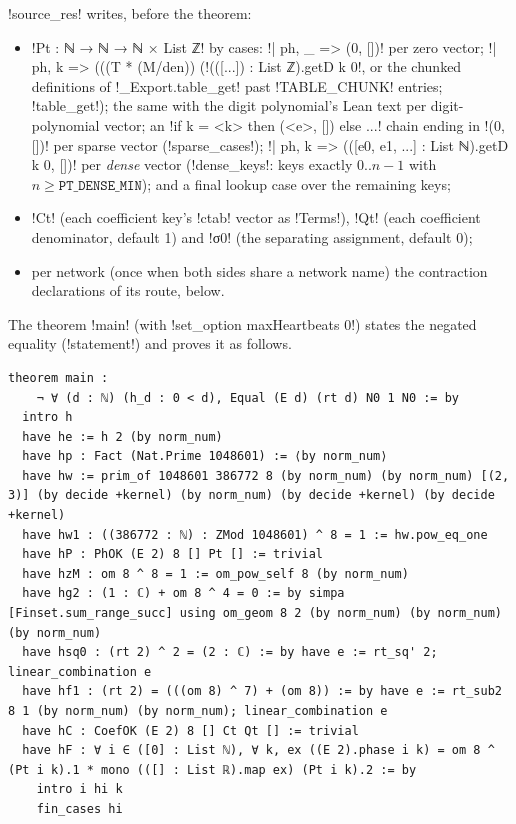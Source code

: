 {{{\lexpy!source_res! writes, before the theorem:
\begin{itemize}
\item \lexlean!Pt : ℕ → ℕ → ℕ × List ℤ! by cases: \lexlean!| ph, _ => (0, [])! per zero vector;
\lexlean!| ph, k => (((T * (M/den)) %
(\lexlean!(([...]) : List ℤ).getD k 0!, or the chunked definitions of \lexpy!_Export.table_get! past
\lexpy!TABLE_CHUNK! entries; \lexpy!table_get!); the same with the digit polynomial's Lean text per
digit-polynomial vector; an \lexcode!if k = <k> then (<e>, []) else ...! chain ending in
\lexlean!(0, [])! per sparse vector (\lexpy!sparse_cases!); \lexlean!| ph, k => (([e0, e1, ...] : List ℕ).getD k 0, [])!
per \emph{dense} vector (\lexpy!dense_keys!: keys exactly $0..n-1$ with $n \ge \mathtt{PT\_DENSE\_MIN}$);
and a final lookup case over the remaining keys;
\item \lexlean!Ct! (each coefficient key's \lexpy!ctab! vector as \lexlean!Terms!), \lexlean!Qt! (each
coefficient denominator, default 1) and \lexlean!σ0! (the separating assignment, default 0);
\item per network (once when both sides share a network name) the contraction declarations of
its route, below.
\end{itemize}
The theorem \lexcode!main! (with \lexcode!set_option maxHeartbeats 0!) states the negated equality
(\lexpy!statement!) and proves it as follows.
\begin{lstlisting}[style=lexlean]
theorem main :
    ¬ ∀ (d : ℕ) (h_d : 0 < d), Equal (E d) (rt d) N0 1 N0 := by
  intro h
  have he := h 2 (by norm_num)
  have hp : Fact (Nat.Prime 1048601) := ⟨by norm_num⟩
  have hw := prim_of 1048601 386772 8 (by norm_num) (by norm_num) [(2, 3)] (by decide +kernel) (by norm_num) (by decide +kernel) (by decide +kernel)
  have hw1 : ((386772 : ℕ) : ZMod 1048601) ^ 8 = 1 := hw.pow_eq_one
  have hP : PhOK (E 2) 8 [] Pt [] := trivial
  have hzM : om 8 ^ 8 = 1 := om_pow_self 8 (by norm_num)
  have hg2 : (1 : ℂ) + om 8 ^ 4 = 0 := by simpa [Finset.sum_range_succ] using om_geom 8 2 (by norm_num) (by norm_num) (by norm_num)
  have hsq0 : (rt 2) ^ 2 = (2 : ℂ) := by have e := rt_sq' 2; linear_combination e
  have hf1 : (rt 2) = (((om 8) ^ 7) + (om 8)) := by have e := rt_sub2 8 1 (by norm_num) (by norm_num); linear_combination e
  have hC : CoefOK (E 2) 8 [] Ct Qt [] := trivial
  have hF : ∀ i ∈ ([0] : List ℕ), ∀ k, ex ((E 2).phase i k) = om 8 ^ (Pt i k).1 * mono (([] : List ℝ).map ex) (Pt i k).2 := by
    intro i hi k
    fin_cases hi

\end{lstlisting}}}}
